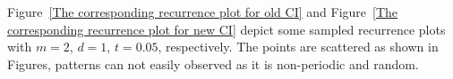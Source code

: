 Figure~\ref{The corresponding recurrence plot for old CI} and Figure~\ref{The corresponding recurrence plot for new CI} depict some sampled  recurrence plots with $m=2$, $d=1$, $t=0.05$, respectively. The points are scattered as shown in Figures, patterns can not easily observed as it is non-periodic and random.
\begin{figure}
\centering
{} \hspace{0.5cm}
\end{figure}
